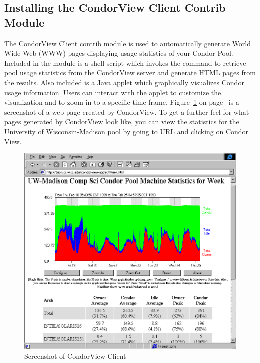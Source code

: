 \subsection{\label{sec:CondorView-Client-Install}
Installing the CondorView Client Contrib Module} 

\newcommand{\MakeStats}{\Prog{make\_stats}}

The CondorView Client contrib module is used to automatically generate
World Wide Web (WWW) pages displaying usage statistics of your Condor
Pool.
Included in the module is a shell script which invokes the 
command to retrieve pool usage statistics from the CondorView server and
generate HTML pages from the results.  
Also included is a Java applet which graphically visualizes Condor 
usage information.  
Users can interact with the applet to customize the visualization and to
zoom in to a specific time frame.
Figure~\ref{fig:view-screenshot} on page~\pageref{fig:view-screenshot}
is a screenshot of a web page created by CondorView.  
To get a further feel for what pages generated by CondorView look like,
you can view the statistics for the University of Wisconsin-Madison pool
by going to URL  and clicking on
Condor View.

\begin{figure}[hbt]
\centering
\includegraphics{admin-man/view-screenshot.ps}
\caption{\label{fig:view-screenshot}Screenshot of CondorView Client}
\end{figure}

